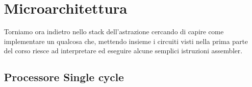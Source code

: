 \chapter{Microarchitettura}
Torniamo ora indietro nello stack dell'astrazione cercando di capire come implementare un qualcosa
che, mettendo insieme i circuiti visti nella prima parte del corso riesce ad interpretare ed
eseguire alcune semplici istruzioni assembler.

\section{Processore Single cycle}

